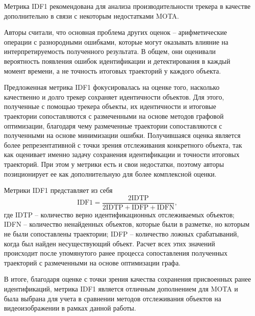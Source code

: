 Метрика IDF1 \cite{ristani2016performance} рекомендована для анализа производительности трекера в качестве дополнительно в связи с некоторым недостатками MOTA.

Авторы считали, что основная проблема других оценок -- арифметические операции с разнородными ошибками, которые могут оказывать влияние на интерпретируемость полученного результата. В общем, они оценивали вероятность появления ошибок идентификации и детектирования в каждый момент времени, а не точность итоговых траекторий у каждого объекта. 

Предложенная метрика IDF1 фокусировалась на оценке того, насколько качественно и долго трекер сохраняет идентичности объектов. Для этого, полученные с помощью трекера объекты, их идентичности и итоговые траектории сопоставляются с размеченными на основе методов графовой оптимизации, благодаря чему размеченные траектории сопоставляются с полученными на основе минимизации ошибки. Получившаяся оценка является более репрезентативной с точки зрения отслеживания конкретного объекта, так как оценивает именно задачу сохранения идентификации и точности итоговых траекторий.  
При этом у метрики есть и свои недостатки, поэтому авторы позиционирует ее как дополнительную для более комплексной оценки. 

Метрики IDF1 представляет из себя
\begin{equation}
    \label{eq:idf1}
    \text{IDF1} = \frac{2 \text{IDTP}}{2\text{IDTP} + \text{IDFP} + \text{IDFN}},
\end{equation}
где IDTP -- количество верно идентификационных отслеживаемых объектов; IDFN -- количество ненайденных объектов, которые были в разметке, но которым не были сопоставлены траектории; IDFP -- количество ложных срабатываний, когда был найден несуществующий объект. 
Расчет всех этих значений происходит после упомянутого ранее процесса сопоставления полученных траекторий с размеченными на основе оптимизации графа. 


В итоге, благодаря оценке с точки зрения качества сохранения присвоенных ранее идентификаций, метрика IDF1 является отличным дополнением для MOTA и была выбрана для учета в сравнении методов отслеживания объектов на видеоизображении в рамках данной работы.
